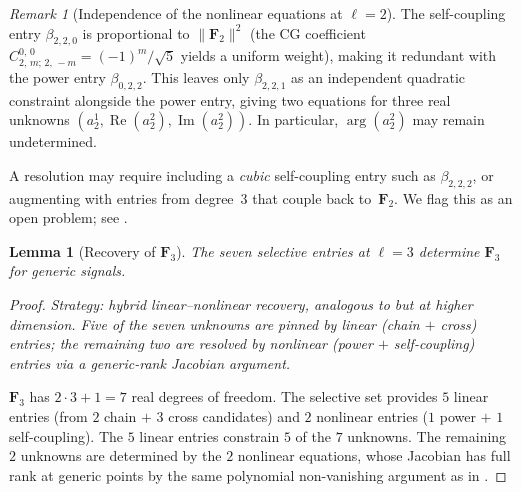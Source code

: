 \documentclass{article}
\theoremstyle{plain}
\newtheorem{lemma}[theorem]{Lemma}
\theoremstyle{definition}
\theoremstyle{remark}
\newtheorem{remark}[theorem]{Remark}
\newcommand{\CG}[6]{C^{#5,\,#6}_{#1,\,#2;\,#3,\,#4}}
\newcommand{\norm}[1]{\lVert #1 \rVert}
\begin{document}
\begin{remark}[Independence of the nonlinear equations at $\ell = 2$]
\label{rem:ell2-gap}
The self-coupling entry $\beta_{2,2,0}$ is proportional to
$\norm{\mathbf{F}_2}^2$ (the CG coefficient
$\CG{2}{m}{2}{-m}{0}{0} = (-1)^m/\sqrt{5}$ yields a uniform weight),
making it redundant with the power entry $\beta_{0,2,2}$. This leaves
only $\beta_{2,2,1}$ as an independent quadratic constraint alongside
the power entry, giving two equations for three real unknowns
$(a_2^1, \operatorname{Re}(a_2^2), \operatorname{Im}(a_2^2))$. In
particular, $\arg(a_2^2)$ may remain undetermined.

A resolution may require including a \emph{cubic} self-coupling entry
such as $\beta_{2,2,2}$, or augmenting with entries from degree~$3$
that couple back to~$\mathbf{F}_2$. We flag this as an open problem;
see .
\end{remark}

\begin{lemma}[Recovery of $\mathbf{F}_3$]\label{lem:F3}
The seven selective entries at $\ell = 3$ determine $\mathbf{F}_3$
for generic signals.
\end{lemma}
\begin{proof}
\emph{Strategy: hybrid linear--nonlinear recovery, analogous to
 but at higher dimension.
Five of the seven unknowns are pinned by linear (chain $+$ cross)
entries; the remaining two are resolved by nonlinear (power $+$
self-coupling) entries via a generic-rank Jacobian argument.}

$\mathbf{F}_3$ has $2 \cdot 3 + 1 = 7$ real degrees of freedom. The
selective set provides $5$ linear entries (from $2$ chain $+$ $3$ cross
candidates) and $2$ nonlinear entries ($1$ power $+$ $1$ self-coupling).
The $5$ linear entries constrain $5$ of the $7$ unknowns. The remaining
$2$ unknowns are determined by the $2$ nonlinear equations, whose
Jacobian has full rank at generic points by the same polynomial
non-vanishing argument as in .
\end{proof}
\end{document}
